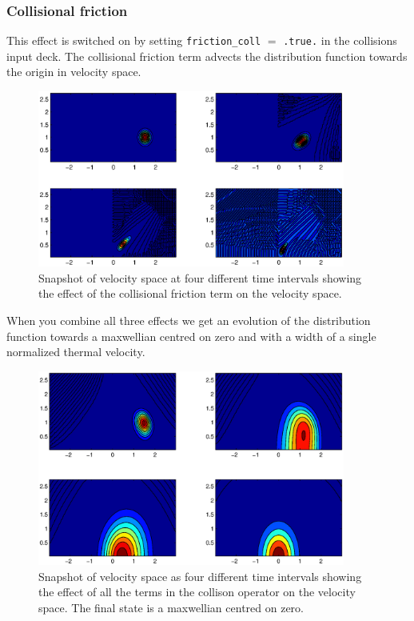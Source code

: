 \documentclass{report}
\begin{document}
\subsubsection{Collisional friction}

This effect is switched on by setting \texttt{friction\_coll} $=$ \texttt{.true.} in the collisions input deck.  The collisional friction term advects the distribution function towards the origin in velocity space.


\begin{figure}
\begin{center}
\includegraphics[width=0.9\textwidth]{collfric.eps}
\caption{Snapshot of velocity space at four different time intervals showing the effect of the collisional friction term on the velocity space.}
\end{center}
\end{figure}

When you combine all three effects we get an evolution of the distribution function towards a maxwellian centred on zero and with a width of a single normalized thermal velocity.

\begin{figure}
\begin{center}
\includegraphics[width=0.9\textwidth]{fulloper.eps}
\caption{Snapshot of velocity space as four different time intervals showing the effect of all the terms in the collison operator on the velocity space.  The final state is a maxwellian centred on zero.}
\end{center}
\end{figure}
\end{document}
